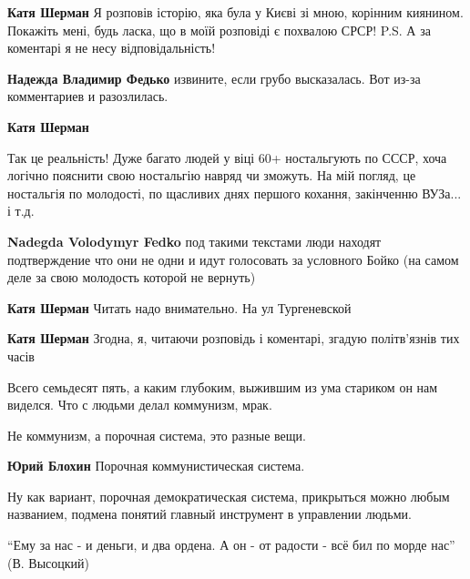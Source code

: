 \begin{itemize}
\begin{itemize} %
\textbf{Катя Шерман} Я розповів історію, яка була у Києві зі мною, корінним киянином.
Покажіть мені, будь ласка, що в моїй розповіді є похвалою СРСР!
P.S.
А за коментарі я не несу відповідальність!

\begin{itemize} %
\textbf{Надежда Владимир Федько} извините, если грубо высказалась. Вот из-за комментариев и разозлилась.

\textbf{Катя Шерман} 

Так це реальність! Дуже багато людей у віці 60+ ностальгують по СССР, хоча
логічно пояснити свою ностальгію навряд чи зможуть. На мій погляд, це
ностальгія по молодості, по щасливих днях першого кохання, закінченню ВУЗа... і
т.д.


\textbf{Nadegda Volodymyr Fedko} под такими текстами люди находят подтверждение что они не одни и идут голосовать за условного Бойко (на самом деле за свою молодость которой не вернуть)
\end{itemize} %

\textbf{Катя Шерман} Читать надо внимательно. На ул Тургеневской

\textbf{Катя Шерман}
Згодна, я, читаючи розповідь і коментарі, згадую політв'язнів тих часів

\end{itemize} %


Всего семьдесят пять, а каким глубоким, выжившим из ума стариком он нам
виделся. Что с людьми делал коммунизм, мрак.

\begin{itemize} %
Не коммунизм, а порочная система, это разные вещи.

\textbf{Юрий Блохин} Порочная коммунистическая система.


Ну как вариант, порочная демократическая система, прикрыться можно любым
названием, подмена понятий главный инструмент в управлении людьми.

\end{itemize} %

\enquote{Ему за нас - и деньги, и два ордена. А он - от радости - всё бил по морде нас} (В. Высоцкий)


\end{itemize}
